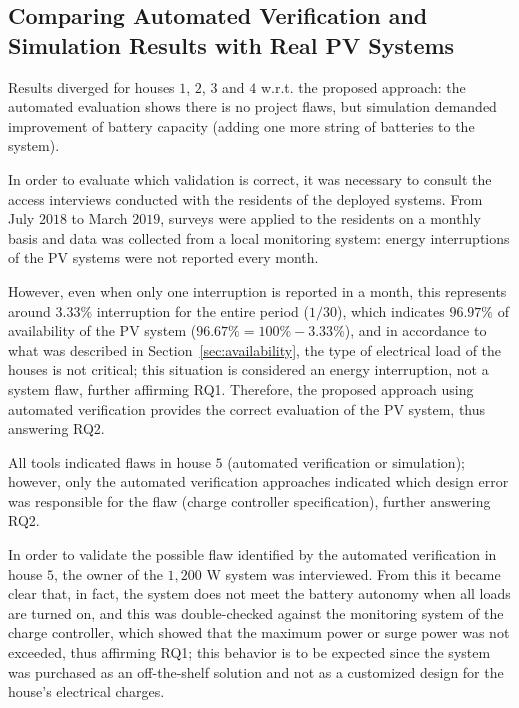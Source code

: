 \subsection{Comparing Automated Verification and Simulation Results with Real PV Systems}

Results diverged for houses $1$, $2$, $3$ and $4$ w.r.t. the proposed approach: the automated evaluation shows there is no project flaws, but simulation demanded improvement of battery capacity (adding one more string of batteries to the system). 

In order to evaluate which validation is correct, it was necessary to consult the access interviews conducted with the residents of the deployed systems. From July $2018$ to March $2019$, surveys were applied to the residents on a monthly basis and data was collected from a local monitoring system: energy interruptions of the PV systems were not reported every month. 

However, even when only one interruption is reported in a month, this represents around $3.33$\% interruption for the entire period ($1/30$), which indicates $96.97$\% of availability of the PV system ($96.67\% = 100\%-3.33\%$), and in accordance to what was described in Section~\ref{sec:availability}, the type of electrical load of the houses is not critical; this situation is considered an energy interruption, not a system flaw, further affirming RQ1. Therefore, the proposed approach using automated verification provides the correct evaluation of the PV system, thus answering RQ2.

All tools indicated flaws in house $5$ (automated verification or simulation); however, only the automated verification approaches indicated which design error was responsible for the flaw (charge controller specification), further answering RQ2.

In order to validate the possible flaw identified by the automated verification in house $5$, the owner of the $1,200$ W system was interviewed. From this it became clear that, in fact, the system does not meet the battery autonomy when all loads are turned on, and this was double-checked against the monitoring system of the charge controller, which showed that the maximum power or surge power was not exceeded, thus affirming RQ1; this behavior is to be expected since the system was purchased as an off-the-shelf solution and not as a customized design for the house's electrical charges. 

%
